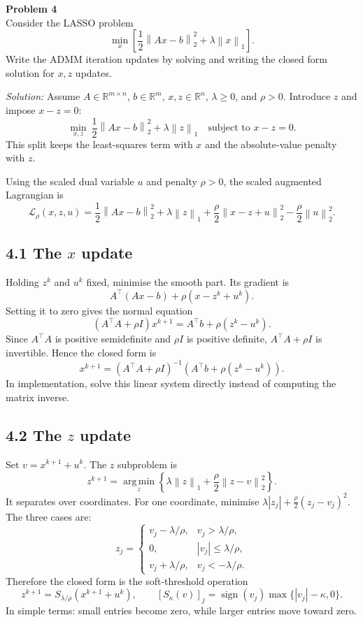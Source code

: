 \documentclass[a4paper,11pt]{article}
\newenvironment{problem}[1]
    {\begin{mdframed}[backgroundcolor=gray!20]\textbf{Problem #1}\\}
    {\end{mdframed}}
\newenvironment{solution}{\textit{Solution:}}{}
\newcommand{\R}{\mathbb{R}}
\newcommand{\argmin}{\operatorname*{arg\,min}}
\newcommand{\norm}[1]{\left\|#1\right\|}
\begin{document}
\clearpage
\begin{problem}{4}
Consider the LASSO problem
\[
\min_x\left[\frac12\norm{Ax-b}_2^2+\lambda\norm{x}_1\right].
\]
Write the ADMM iteration updates by solving and writing the closed form solution for $x,z$ updates.
\end{problem}

\begin{solution}
Assume $A\in\R^{m\times n}$, $b\in\R^m$, $x,z\in\R^n$, $\lambda\ge0$, and $\rho>0$.
Introduce $z$ and impose $x-z=0$:
\[
\min_{x,z}\ \frac12\norm{Ax-b}_2^2+\lambda\norm{z}_1
\quad\text{subject to }x-z=0.
\]
This split keeps the least-squares term with $x$ and the absolute-value penalty with $z$.

Using the scaled dual variable $u$ and penalty $\rho>0$, the scaled augmented Lagrangian is
\[
\mathcal L_\rho(x,z,u)=\frac12\norm{Ax-b}_2^2+\lambda\norm{z}_1
 +\frac\rho2\norm{x-z+u}_2^2-\frac\rho2\norm{u}_2^2.
\]

\subsection*{4.1 The $x$ update}
Holding $z^k$ and $u^k$ fixed, minimise the smooth part. Its gradient is
\[
A^\top(Ax-b)+\rho(x-z^k+u^k).
\]
Setting it to zero gives the normal equation
\[
(A^\top A+\rho I)x^{k+1}=A^\top b+\rho(z^k-u^k).
\]
Since $A^\top A$ is positive semidefinite and $\rho I$ is positive definite,
$A^\top A+\rho I$ is invertible. Hence the closed form is
\[
\boxed{x^{k+1}=(A^\top A+\rho I)^{-1}\left(A^\top b+\rho(z^k-u^k)\right).}
\]
In implementation, solve this linear system directly instead of computing the matrix inverse.

\subsection*{4.2 The $z$ update}
Set $v=x^{k+1}+u^k$. The $z$ subproblem is
\[
z^{k+1}=\argmin_z\left\{\lambda\norm{z}_1+\frac\rho2\norm{z-v}_2^2\right\}.
\]
It separates over coordinates. For one coordinate, minimise
$\lambda|z_j|+\frac\rho2(z_j-v_j)^2$. The three cases are:
\[
z_j=\begin{cases}
v_j-\lambda/\rho,&v_j>\lambda/\rho,\\
0,&|v_j|\le\lambda/\rho,\\
v_j+\lambda/\rho,&v_j<-\lambda/\rho.
\end{cases}
\]
Therefore the closed form is the soft-threshold operation
\[
\boxed{z^{k+1}=S_{\lambda/\rho}(x^{k+1}+u^k)},\qquad
[S_\kappa(v)]_j=\operatorname{sign}(v_j)\max\{|v_j|-\kappa,0\}.
\]
In simple terms: small entries become zero, while larger entries move toward zero.


\end{solution}
\end{document}
